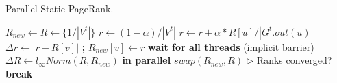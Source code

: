 \begin{algorithm}[!hbt]
\caption{Parallel Static PageRank.}
\label{alg:prst}
\begin{algorithmic}[1]

\Statex

  \State $R_{new} \gets R \gets \{1/|V^t|\}$
  \ForAll{$i \in [0 .. MAX\_ITERATIONS)$}
      \State $r \gets (1 - \alpha)/|V^t|$
        \State $r \gets r + \alpha * R[u] / |G^t.out(u)|$
      \EndFor
      \State $\Delta r \gets |r - R[v]|$ \textbf{;} $R_{new}[v] \gets r$
    \EndFor
    \State \textbf{wait for all threads} (implicit barrier)
    \State $\Delta R \gets l_\infty Norm(R, R_{new})$ \textbf{in parallel}
    \State $swap(R_{new}, R)$
    \State $\rhd$ Ranks converged?
     \textbf{break}
    \EndIf
  \EndFor
\EndFunction
\end{algorithmic}
\end{algorithm}





